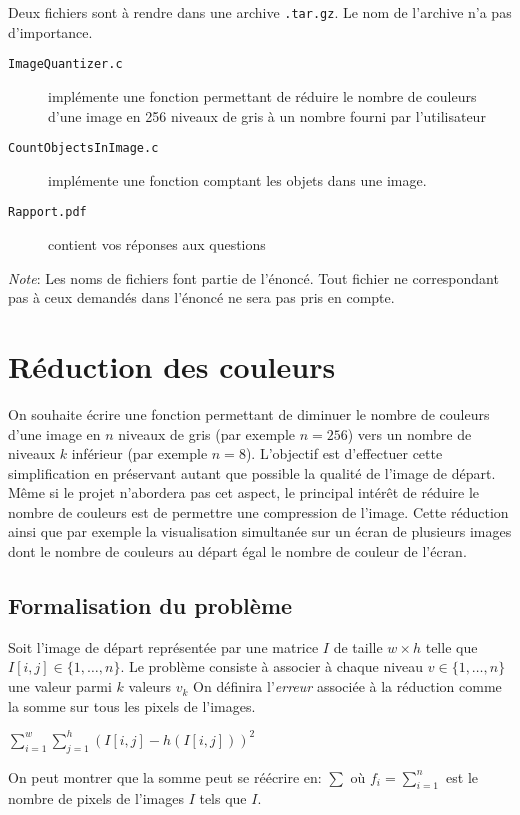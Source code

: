 \documentclass[a4paper,10pt]{article}
\begin{document}
Deux fichiers sont à rendre dans une archive \texttt{.tar.gz}. Le nom de l'archive n'a pas d'importance.
\begin{description}
\item[\texttt{ImageQuantizer.c}] implémente une fonction permettant de réduire le nombre de couleurs d'une image en 256 niveaux de gris à un nombre fourni par l'utilisateur
\item[\texttt{CountObjectsInImage.c}] implémente une fonction comptant les objets dans une image.
\item[\texttt{Rapport.pdf}] contient vos réponses aux questions
\end{description}

{\em Note}: Les noms de fichiers font partie de l'énoncé. Tout fichier ne
correspondant pas à ceux demandés dans l'énoncé ne sera pas pris en compte.

\section{Réduction des couleurs}

On souhaite écrire une fonction permettant de diminuer le nombre de
couleurs d'une image en $n$ niveaux de gris (par exemple $n=256$) vers
un nombre de niveaux $k$ inférieur (par exemple $n=8$). L'objectif est
d'effectuer cette simplification en préservant autant que possible la
qualité de l'image de départ. Même si le projet n'abordera pas cet
aspect, le principal intérêt de réduire le nombre de couleurs est de
permettre une compression de l'image. Cette réduction ainsi que par
exemple la visualisation simultanée sur un écran de plusieurs images
dont le nombre de couleurs au départ égal le nombre de couleur de
l'écran.

\subsection*{Formalisation du problème}

Soit l'image de départ représentée par une matrice $I$ de taille
$w\times h$ telle que $I[i,j]\in\{1,\ldots,n\}$. Le problème consiste
à associer à chaque niveau $v\in \{1,\ldots,n\}$ une valeur parmi $k$
valeurs $v_k$ On définira l'{\it erreur} associée à la réduction comme
la somme sur tous les pixels de l'images.

$\sum_{i=1}^w\sum_{j=1}^h (I[i,j]-h(I[i,j]))^2$

On peut montrer que la somme peut se réécrire en:
$\sum$
où $f_i=\sum_{i=1}^n$ est le nombre de pixels de l'images $I$ tels que $I$.
\end{document}
